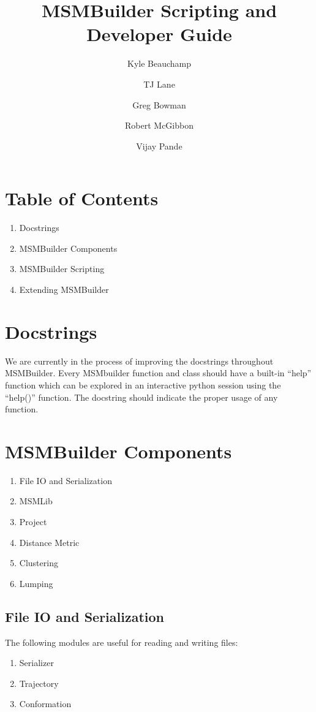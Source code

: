 \documentclass[12pt]{article}
\title
{MSMBuilder Scripting and Developer Guide
}
\author{Kyle Beauchamp \and TJ Lane \and Greg Bowman \and  Robert McGibbon \and Vijay Pande}
\begin{document}
\maketitle


\section{Table of Contents}
\begin{enumerate}
\item Docstrings
\item MSMBuilder Components
\item MSMBuilder Scripting
\item Extending MSMBuilder
\end{enumerate}

\newpage

\section{Docstrings}

We are currently in the process of improving the docstrings throughout MSMBuilder.  Every MSMbuilder function and class should have a built-in ``help'' function which can be explored in an interactive python session using the ``help()'' function.  The docstring should indicate the proper usage of any function.

\section{MSMBuilder Components}

\begin{enumerate}
 \item File IO and Serialization
 \item MSMLib
 \item Project
 \item Distance Metric
 \item Clustering
 \item Lumping
 
\end{enumerate}
 
\subsection{File IO and Serialization}

The following modules are useful for reading and writing files:
\begin{enumerate}
 \item Serializer
 \item Trajectory
 \item Conformation
\end{enumerate}
\end{document}
